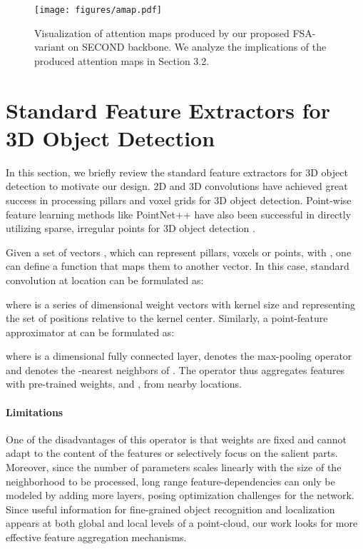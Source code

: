\documentclass[10pt,twocolumn,letterpaper]{article}
\begin{document}
\begin{figure*}[h]
    \centering
    \texttt{[image: figures/amap.pdf]}
    \caption{Visualization of attention maps produced by our proposed FSA-variant on SECOND \cite{SECOND} backbone. We analyze the implications of the produced attention maps in Section 3.2.}
    \label{fig:vis_attn}
\end{figure*}
 \section{Standard Feature Extractors for 3D Object Detection}
In this section, we briefly review the standard feature extractors for 3D object detection to motivate our design. 2D and 3D convolutions have achieved great success in processing pillars \cite{pointpillars} and voxel grids \cite{SECOND} for 3D object detection. Point-wise feature learning methods like PointNet++ \cite{pointnetplusplus} have also been successful in directly utilizing sparse, irregular points for 3D object detection \cite{PointRCNN}. 

Given a set of vectors , which can represent pillars, voxels or points, with , one can define a function  that maps them to another vector. In this case, standard convolution at location  can be formulated as:

where  is a series of  dimensional weight vectors with kernel size  and  representing the set of positions relative to the kernel center. Similarly, a point-feature approximator at  can be formulated as:

where  is a  dimensional fully connected layer,  denotes the max-pooling operator and  denotes the -nearest neighbors of . 
The operator  thus aggregates features with pre-trained weights,  and , from nearby locations.

\paragraph{Limitations}  One of the disadvantages of this operator is that weights are fixed and cannot adapt to the content of the features or selectively focus on the salient parts. Moreover, since the number of parameters scales linearly with the size of the neighborhood to be processed, long range feature-dependencies can only be modeled by adding more layers, posing optimization challenges for the network. Since useful information for fine-grained object recognition and localization appears at both global and local levels of a point-cloud, our work looks for more effective feature aggregation mechanisms.
 
\end{document}
